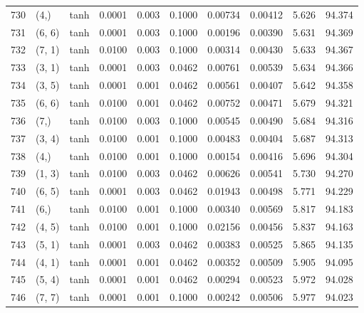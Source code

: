\begin{tabular}{lllrrrrrrr}
730 &        (4,) &      tanh &  0.0001 &  0.003 &  0.1000 &          0.00734 &    0.00412 &       5.626 &    94.374 \\
731 &      (6, 6) &      tanh &  0.0001 &  0.003 &  0.1000 &          0.00196 &    0.00390 &       5.631 &    94.369 \\
732 &      (7, 1) &      tanh &  0.0100 &  0.003 &  0.1000 &          0.00314 &    0.00430 &       5.633 &    94.367 \\
733 &      (3, 1) &      tanh &  0.0001 &  0.003 &  0.0462 &          0.00761 &    0.00539 &       5.634 &    94.366 \\
734 &      (3, 5) &      tanh &  0.0001 &  0.001 &  0.0462 &          0.00561 &    0.00407 &       5.642 &    94.358 \\
735 &      (6, 6) &      tanh &  0.0100 &  0.001 &  0.0462 &          0.00752 &    0.00471 &       5.679 &    94.321 \\
736 &        (7,) &      tanh &  0.0100 &  0.003 &  0.1000 &          0.00545 &    0.00490 &       5.684 &    94.316 \\
737 &      (3, 4) &      tanh &  0.0100 &  0.001 &  0.1000 &          0.00483 &    0.00404 &       5.687 &    94.313 \\
738 &        (4,) &      tanh &  0.0100 &  0.001 &  0.1000 &          0.00154 &    0.00416 &       5.696 &    94.304 \\
739 &      (1, 3) &      tanh &  0.0100 &  0.003 &  0.0462 &          0.00626 &    0.00541 &       5.730 &    94.270 \\
740 &      (6, 5) &      tanh &  0.0001 &  0.003 &  0.0462 &          0.01943 &    0.00498 &       5.771 &    94.229 \\
741 &        (6,) &      tanh &  0.0100 &  0.001 &  0.1000 &          0.00340 &    0.00569 &       5.817 &    94.183 \\
742 &      (4, 5) &      tanh &  0.0100 &  0.001 &  0.1000 &          0.02156 &    0.00456 &       5.837 &    94.163 \\
743 &      (5, 1) &      tanh &  0.0001 &  0.003 &  0.0462 &          0.00383 &    0.00525 &       5.865 &    94.135 \\
744 &      (4, 1) &      tanh &  0.0001 &  0.001 &  0.0462 &          0.00352 &    0.00509 &       5.905 &    94.095 \\
745 &      (5, 4) &      tanh &  0.0001 &  0.001 &  0.0462 &          0.00294 &    0.00523 &       5.972 &    94.028 \\
746 &      (7, 7) &      tanh &  0.0001 &  0.001 &  0.1000 &          0.00242 &    0.00506 &       5.977 &    94.023 \\

\end{tabular}
